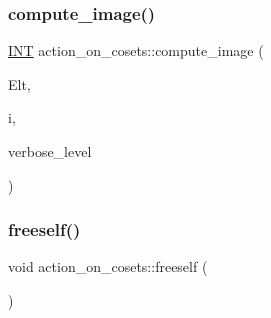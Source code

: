 \subsubsection{\texorpdfstring{compute\+\_\+image()}{compute\_image()}}
{\footnotesize\ttfamily \mbox{\hyperlink{galois_8h_a09fddde158a3a20bd2dcadb609de11dc}{I\+NT}} action\+\_\+on\+\_\+cosets\+::compute\+\_\+image (\begin{DoxyParamCaption}\item[{\mbox{\hyperlink{galois_8h_a09fddde158a3a20bd2dcadb609de11dc}{I\+NT}} $\ast$}]{Elt,  }\item[{\mbox{\hyperlink{galois_8h_a09fddde158a3a20bd2dcadb609de11dc}{I\+NT}}}]{i,  }\item[{\mbox{\hyperlink{galois_8h_a09fddde158a3a20bd2dcadb609de11dc}{I\+NT}}}]{verbose\+\_\+level }\end{DoxyParamCaption})}

\mbox{\label{classaction__on__cosets_a6a02c260572535d8e49d4fafedcae303}} 
\subsubsection{\texorpdfstring{freeself()}{freeself()}}
{\footnotesize\ttfamily void action\+\_\+on\+\_\+cosets\+::freeself (\begin{DoxyParamCaption}{ }\end{DoxyParamCaption})}

\mbox{\label{classaction__on__cosets_af1fc4c6432b3c9a718c37eb298924b2e}} 
